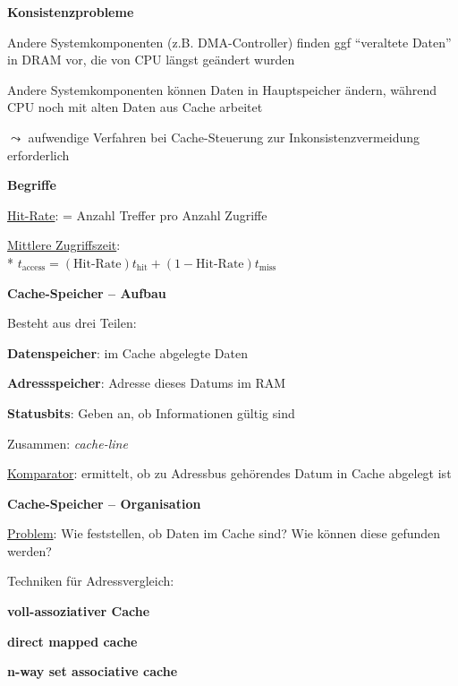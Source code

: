 \textbf{Konsistenzprobleme}
\begin{items}
	\item Andere Systemkomponenten (z.B. DMA-Controller) finden ggf "`veraltete Daten"' in DRAM vor, die von CPU längst geändert wurden
	\item Andere Systemkomponenten können Daten in Hauptspeicher ändern, während CPU noch mit alten Daten aus Cache arbeitet
	\item \( \leadsto \) aufwendige Verfahren bei Cache-Steuerung zur Inkonsistenzvermeidung erforderlich
\end{items}

\textbf{Begriffe}
\begin{items}
	\item \underline{Hit-Rate}: = Anzahl Treffer pro Anzahl Zugriffe
	\item \underline{Mittlere Zugriffszeit}: \\*
		\( t_{\text{access}} = (\text{Hit-Rate})t_\text{hit}+(1-\text{Hit-Rate})t_\text{miss} \)
\end{items}

\textbf{Cache-Speicher -- Aufbau}
\begin{items}
	\item Besteht aus drei Teilen:
	\begin{enumeration}
		\item \textbf{Datenspeicher}: im Cache abgelegte Daten
		\item \textbf{Adressspeicher}: Adresse dieses Datums im RAM
		\item \textbf{Statusbits}: Geben an, ob Informationen gültig sind
	\end{enumeration}
	\item Zusammen: \emph{cache-line}
	\item \underline{Komparator}: ermittelt, ob zu Adressbus gehörendes Datum in Cache abgelegt ist
\end{items}

\textbf{Cache-Speicher -- Organisation}
\begin{items}
	\item \underline{Problem}: Wie feststellen, ob Daten im Cache sind? Wie können diese gefunden werden?
	\item Techniken für Adressvergleich:
	\begin{enumeration}
		\item \textbf{voll-assoziativer Cache}
		\item \textbf{direct mapped cache}
		\item \textbf{n-way set associative cache}
	\end{enumeration}
\end{items}

